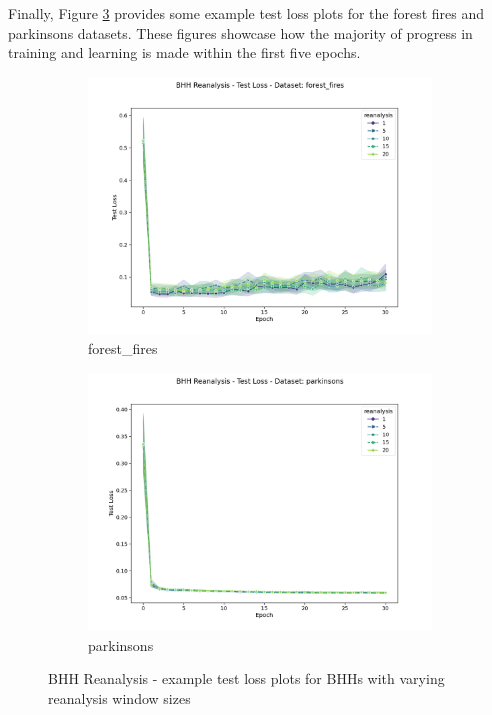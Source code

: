 Finally, Figure \ref{fig:results:reanalysis:figures:loss} provides some example test loss plots for the forest fires and parkinsons datasets. These figures showcase how the majority of progress in training and learning is made within the first five epochs.


\begin{figure}[htbp]
	\begin{subfigure}{0.5\textwidth}
    	\centering
        \includegraphics[width=\textwidth]{analysis/bhh_reanalysis/figures/test/loss/forest_fires.png}
        \caption{forest\_fires}
        \label{fig:results:reanalysis:figures:loss1}
	\end{subfigure}
	\begin{subfigure}{0.5\textwidth}
    	\centering
        \includegraphics[width=\textwidth]{analysis/bhh_reanalysis/figures/test/loss/parkinsons.png}
        \caption{parkinsons}
        \label{fig:results:reanalysis:figures:loss2}
	\end{subfigure}
	\caption{\Acs{BHH} Reanalysis - example test loss plots for \Acsp{BHH} with varying reanalysis window sizes} 
	\label{fig:results:reanalysis:figures:loss}
\end{figure}

